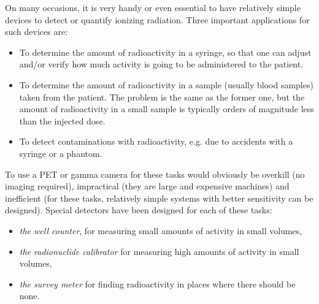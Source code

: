\documentclass[11pt,oneside]{article}
\begin{document}
On many occasions, it is very handy or even essential to have
relatively simple devices to detect or quantify ionizing
radiation. Three important applications for such devices are:
\begin{itemize}
  \item To determine the amount of radioactivity in a syringe, so that
        one can adjust and/or verify how much activity is going to be
        administered to the patient.
  \item To determine the amount of radioactivity in a sample
        (usually blood samples) taken from the patient. The problem
        is the same as the former one, but the amount of radioactivity
        in a small sample is typically orders of magnitude less than
        the injected dose.
  \item To detect contaminations with radioactivity, e.g. due to
        accidents with a syringe or a phantom.
\end{itemize}
To use a PET or gamma camera for these tasks would obviously be
overkill (no imaging required), impractical (they are large and
expensive machines) and inefficient (for these tasks, relatively
simple systems with better sensitivity can be designed). Special
detectors have been designed for each of these tasks:
\begin{itemize}
  \item {\em the well counter}, for measuring small amounts of
        activity in small volumes,
  \item {\em the radionuclide calibrator} for measuring high amounts of
        activity in small volumes,
  \item {\em the survey meter} for finding radioactivity in places
        where there should be none.
\end{itemize}
\end{document}
